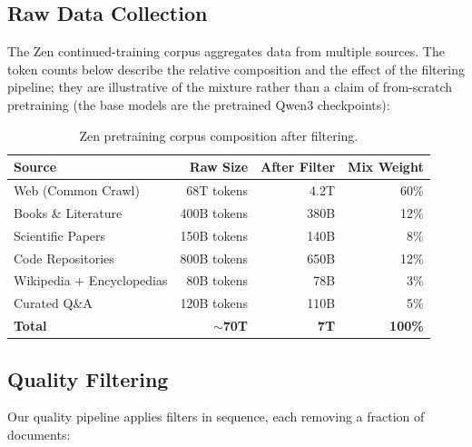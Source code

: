 \documentclass[11pt,a4paper]{article}
\begin{document}
\subsection{Raw Data Collection}

The Zen continued-training corpus aggregates data from multiple sources. The token
counts below describe the relative composition and the effect of the filtering pipeline;
they are illustrative of the mixture rather than a claim of from-scratch pretraining
(the base models are the pretrained Qwen3 checkpoints):

\begin{table}[H]
\centering
\begin{tabular}{lrrr}
\toprule
\textbf{Source} & \textbf{Raw Size} & \textbf{After Filter} & \textbf{Mix Weight} \\
\midrule
Web (Common Crawl) & 68T tokens & 4.2T & 60\% \\
Books \& Literature & 400B tokens & 380B & 12\% \\
Scientific Papers & 150B tokens & 140B & 8\% \\
Code Repositories & 800B tokens & 650B & 12\% \\
Wikipedia + Encyclopedias & 80B tokens & 78B & 3\% \\
Curated Q\&A & 120B tokens & 110B & 5\% \\
\midrule
\textbf{Total} & \textbf{$\sim$70T} & \textbf{7T} & \textbf{100\%} \\
\bottomrule
\end{tabular}
\caption{Zen pretraining corpus composition after filtering.}
\end{table}

\subsection{Quality Filtering}

Our quality pipeline applies filters in sequence, each removing a fraction of documents:
\end{document}
